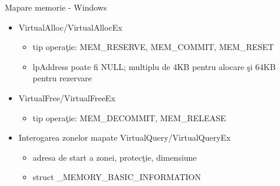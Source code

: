\documentclass{so.cs.pub.ro}
\begin{document}
\begin{frame}{Mapare memorie - Windows}
\begin{itemize}
  \item VirtualAlloc/VirtualAllocEx
  \begin{itemize}
    \item tip operaţie: MEM_RESERVE, MEM_COMMIT, MEM_RESET
    \item lpAddress poate fi NULL; multiplu de 4KB pentru alocare şi 64KB pentru rezervare
  \end{itemize}
  \vspace{0.3cm}
  \item VirtualFree/VirtualFreeEx
  \begin{itemize}
    \item tip operaţie: MEM_DECOMMIT, MEM_RELEASE
  \end{itemize}
  \vspace{0.3cm}
  \item Interogarea zonelor mapate VirtualQuery/VirtualQueryEx
  \begin{itemize}
    \item adresa de start a zonei, protecţie, dimensiune
    \item struct _MEMORY_BASIC_INFORMATION
  \end{itemize}
\end{itemize}
\end{frame}
\end{document}
